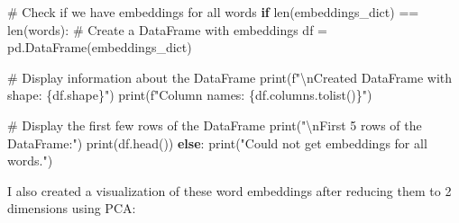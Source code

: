 \documentclass[
  letterpaper,
  DIV=11,
  numbers=noendperiod]{scrartcl}
\newenvironment{Shaded}{\begin{snugshade}}{\end{snugshade}}
\newcommand{\BuiltInTok}[1]{\textcolor[rgb]{0.00,0.23,0.31}{#1}}
\newcommand{\CharTok}[1]{\textcolor[rgb]{0.13,0.47,0.30}{#1}}
\newcommand{\CommentTok}[1]{\textcolor[rgb]{0.37,0.37,0.37}{#1}}
\newcommand{\ControlFlowTok}[1]{\textcolor[rgb]{0.00,0.23,0.31}{\textbf{#1}}}
\newcommand{\NormalTok}[1]{\textcolor[rgb]{0.00,0.23,0.31}{#1}}
\newcommand{\OperatorTok}[1]{\textcolor[rgb]{0.37,0.37,0.37}{#1}}
\newcommand{\SpecialCharTok}[1]{\textcolor[rgb]{0.37,0.37,0.37}{#1}}
\newcommand{\SpecialStringTok}[1]{\textcolor[rgb]{0.13,0.47,0.30}{#1}}
\newcommand{\StringTok}[1]{\textcolor[rgb]{0.13,0.47,0.30}{#1}}
\begin{document}
\begin{Shaded}
\begin{Highlighting}[]
\CommentTok{\# Check if we have embeddings for all words}
\ControlFlowTok{if} \BuiltInTok{len}\NormalTok{(embeddings\_dict) }\OperatorTok{==} \BuiltInTok{len}\NormalTok{(words):}
    \CommentTok{\# Create a DataFrame with embeddings}
\NormalTok{    df }\OperatorTok{=}\NormalTok{ pd.DataFrame(embeddings\_dict)}
    
    \CommentTok{\# Display information about the DataFrame}
    \BuiltInTok{print}\NormalTok{(}\SpecialStringTok{f"}\CharTok{\textbackslash{}n}\SpecialStringTok{Created DataFrame with shape: }\SpecialCharTok{\{}\NormalTok{df}\SpecialCharTok{.}\NormalTok{shape}\SpecialCharTok{\}}\SpecialStringTok{"}\NormalTok{)}
    \BuiltInTok{print}\NormalTok{(}\SpecialStringTok{f"Column names: }\SpecialCharTok{\{}\NormalTok{df}\SpecialCharTok{.}\NormalTok{columns}\SpecialCharTok{.}\NormalTok{tolist()}\SpecialCharTok{\}}\SpecialStringTok{"}\NormalTok{)}
    
    \CommentTok{\# Display the first few rows of the DataFrame}
    \BuiltInTok{print}\NormalTok{(}\StringTok{"}\CharTok{\textbackslash{}n}\StringTok{First 5 rows of the DataFrame:"}\NormalTok{)}
    \BuiltInTok{print}\NormalTok{(df.head())}
\ControlFlowTok{else}\NormalTok{:}
    \BuiltInTok{print}\NormalTok{(}\StringTok{"Could not get embeddings for all words."}\NormalTok{)}
\end{Highlighting}
\end{Shaded}

I also created a visualization of these word embeddings after reducing
them to 2 dimensions using PCA:
\end{document}
